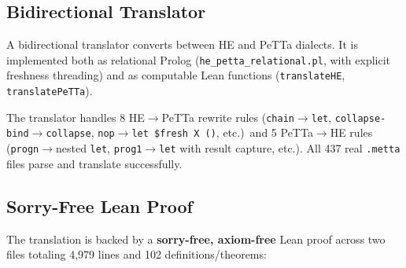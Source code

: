 \documentclass[11pt]{article}
\newcommand{\code}[1]{\texttt{#1}}
\newcommand{\PeTTa}{\textup{PeTTa}}
\newcommand{\HE}{\textup{HE}}
\begin{document}
\subsection{Bidirectional Translator}

A bidirectional translator converts between \HE{} and \PeTTa{} dialects.
It is implemented both as relational Prolog
(\code{he\_petta\_relational.pl}, with explicit freshness threading) and
as computable Lean functions (\code{translateHE}, \code{translatePeTTa}).

The translator handles 8 \HE{}$\to$\PeTTa{} rewrite rules
(\code{chain}$\to$\code{let}, \code{collapse-bind}$\to$\code{collapse},
\code{nop}$\to$\code{let~\$fresh~X~()}, etc.)\ and 5
\PeTTa{}$\to$\HE{} rules (\code{progn}$\to$nested \code{let},
\code{prog1}$\to$\code{let} with result capture, etc.).  All 437 real
\code{.metta} files parse and translate successfully.

\subsection{Sorry-Free Lean Proof}

The translation is backed by a \textbf{sorry-free, axiom-free} Lean
proof across two files totaling 4{,}979 lines and 102
definitions/theorems:
\end{document}
